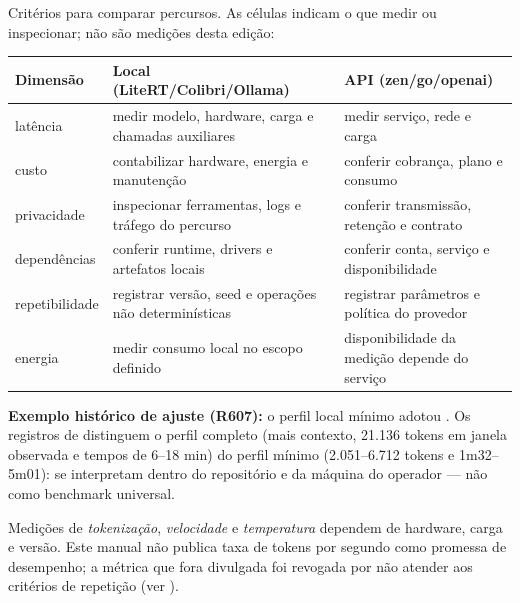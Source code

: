 
\begin{resultado}
Critérios para comparar percursos. As células indicam o que medir ou
inspecionar; não são medições desta edição:\par
\smallskip
{\footnotesize
\begin{tabularx}{\linewidth}{Y Y Y}
\toprule
Dimensão & Local (LiteRT/Colibri/Ollama) & API (zen/go/openai) \\
\midrule
latência & medir modelo, hardware, carga e chamadas auxiliares & medir serviço, rede e carga \\
custo & contabilizar hardware, energia e manutenção & conferir cobrança, plano e consumo \\
privacidade & inspecionar ferramentas, logs e tráfego do percurso & conferir transmissão, retenção e contrato \\
dependências & conferir runtime, drivers e artefatos locais & conferir conta, serviço e disponibilidade \\
repetibilidade & registrar versão, seed e operações não determinísticas & registrar parâmetros e política do provedor \\
energia & medir consumo local no escopo definido & disponibilidade da medição depende do serviço \\
\bottomrule
\end{tabularx}\par}
\end{resultado}

\begin{metodo}
\textbf{Exemplo histórico de ajuste (R607):} o perfil local mínimo adotou
. Os registros de  distinguem o
perfil completo (mais contexto, 21.136 tokens em janela observada e tempos de
6--18 min) do perfil mínimo (2.051--6.712 tokens e 1m32--5m01): se interpretam
dentro do repositório e da máquina do operador — não como benchmark universal.
\end{metodo}

\begin{aviso}
Medições de \emph{tokenização}, \emph{velocidade} e \emph{temperatura} dependem de
hardware, carga e versão. Este manual não publica taxa de tokens por segundo como
promessa de desempenho; a métrica que fora divulgada foi revogada por não atender
aos critérios de repetição (ver ).
\end{aviso}

